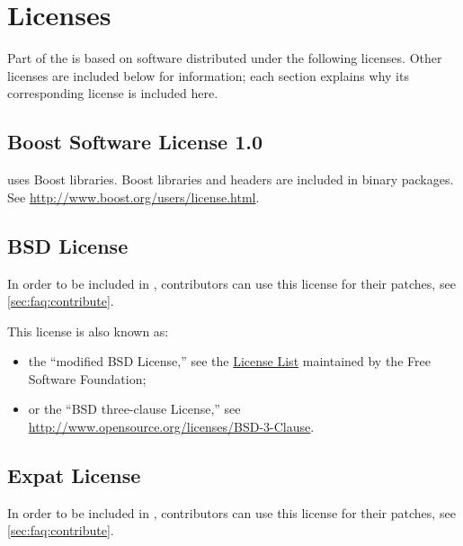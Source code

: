 
\chapter{Licenses}
\label{sec:licenses}

\newcommand{\inputLicense}[1]
{%
}

Part of the \usdk is based on software distributed under the following
licenses.  Other licenses are included below for information; each section
explains why its corresponding license is included here.


\section{Boost Software License 1.0}
\usdk uses Boost libraries.  Boost libraries and headers are included in
binary packages.  See \url{http://www.boost.org/users/license.html}.

\inputLicense{boost-1.0}

\section{BSD License}
\label{sec:license:bsd}
In order to be included in \usdk, contributors can use this license for
their patches, see \autoref{sec:faq:contribute}.

This license is also known as:
\begin{itemize}
\item the ``modified BSD License,'' see the
  \href{http://www.gnu.org/licenses/license-list.html}{License List}
  maintained by the Free Software Foundation;
\item or the ``BSD three-clause License,'' see
  \url{http://www.opensource.org/licenses/BSD-3-Clause}.

\end{itemize}

\inputLicense{bsd}

\section{Expat License}
\label{sec:license:expat}
In order to be included in \usdk, contributors can use this license for
their patches, see \autoref{sec:faq:contribute}.

